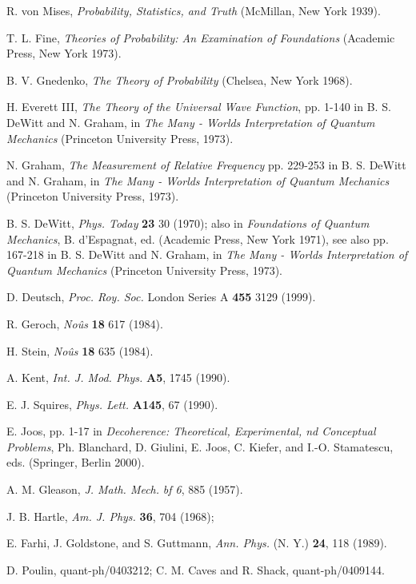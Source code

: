 \documentclass[aps,pra,epsfig,11pt,floatfix]{revtex4}
\begin{document}
\noindent[18] R. von Mises, {\it Probability, Statistics, and Truth} 
(McMillan, New York 1939).

\noindent[19] T. L. Fine, {\it Theories of Probability: 
An Examination of Foundations} (Academic Press, New York 1973).

\noindent[20] B. V. Gnedenko, {\it The Theory of Probability} 
(Chelsea, New York 1968).

\noindent[21] H. Everett III, {\it The Theory of the Universal Wave Function}, 
pp. 1-140 in B. S. DeWitt and N. Graham, in 
{\it The Many - Worlds Interpretation 
of Quantum Mechanics} (Princeton University Press, 1973).

\noindent[22] N. Graham, {\it The Measurement of Relative Frequency} 
pp. 229-253 
in B. S. DeWitt and N. Graham, in {\it The Many - Worlds Interpretation 
of Quantum Mechanics} (Princeton University Press, 1973).

\noindent[23] B. S. DeWitt, {\it Phys. Today} {\bf 23} 30 (1970); also 
in {\it Foundations of Quantum Mechanics}, B. d'Espagnat, ed.
(Academic Press, New York 1971), see also pp. 167-218
in B. S. DeWitt and N. Graham, in {\it The Many - Worlds Interpretation 
of Quantum Mechanics} (Princeton University Press, 1973).

\noindent[24] D. Deutsch, {\it Proc. Roy. Soc.} London Series A {\bf 455} 3129 (1999).

\noindent[25] R. Geroch, {\it No\^us} {\bf 18} 617 (1984).

\noindent[26] H. Stein, {\it No\^us} {\bf 18} 635 (1984).

\noindent[27] A. Kent, {\it Int. J. Mod. Phys.} {\bf A5}, 1745 (1990).

\noindent[28] E. J. Squires, {\it Phys. Lett.} {\bf A145}, 67 (1990).

\noindent[29] E. Joos, pp. 1-17 in {\it Decoherence: Theoretical, 
Experimental, nd  Conceptual Problems}, Ph. Blanchard, D. Giulini, 
E. Joos, C. Kiefer, and I.-O. Stamatescu, eds. (Springer, Berlin 2000).

\noindent[30] A. M. Gleason, {\it J. Math. Mech.} {\it bf 6}, 885 (1957).

\noindent[31] J. B. Hartle, {\it Am. J. Phys.} {\bf 36}, 704 (1968);


\noindent[32] E. Farhi, J. Goldstone, and S. Guttmann, {\it Ann. Phys.} 
(N. Y.) {\bf 24}, 118 (1989).

\noindent[33] D. Poulin, quant-ph/0403212; C. M. Caves and R. Shack, quant-ph/0409144.
\end{document}
